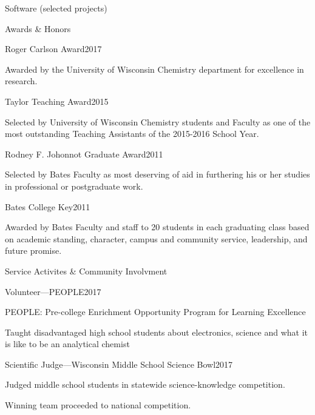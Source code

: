 \documentclass{resume}  %
\begin{document}
\begin{rSection}{Software (selected projects)}
\begin{rSection}{Awards \& Honors}
\begin{rSubsection}{Roger Carlson Award}{2017}{}{}
	\item Awarded by the University of Wisconsin Chemistry department for excellence in research.
\end{rSubsection}

\begin{rSubsection}{Taylor Teaching Award}{2015}{}{}
\item  Selected by University of Wisconsin Chemistry students and Faculty as one of the most outstanding Teaching Assistants of the 2015-2016 School Year.
\end{rSubsection}

\begin{rSubsection}{Rodney F. Johonnot Graduate Award}{2011}{}{}
\item  Selected by Bates Faculty as most deserving of aid in furthering his or her studies in professional or postgraduate work.
\end{rSubsection}

\begin{rSubsection}{Bates College Key}{2011}{}{}
\item Awarded by Bates Faculty and staff to 20 students in each graduating class based on academic standing, character, campus and community service, leadership, and future promise.
\end{rSubsection}

\end{rSection}

\begin{rSection}{Service Activites \& Community Involvment}

\begin{rSubsection}{Volunteer---PEOPLE}{2017}{}{}
	\item PEOPLE: Pre-college Enrichment Opportunity Program for Learning Excellence
	\item Taught disadvantaged high school students about electronics, science and what it is like to be an analytical chemist
\end{rSubsection}

\begin{rSubsection}{Scientific Judge---Wisconsin Middle School Science Bowl}{2017}{}{}
\item Judged middle school students in statewide science-knowledge competition.
\item Winning team proceeded to national competition.
\end{rSubsection}


\end{rSection}
\end{rSection}
\end{document}
